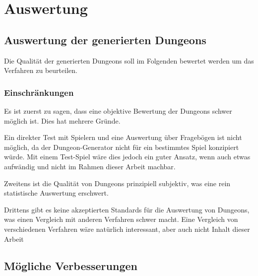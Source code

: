
\chapter{Auswertung}

\section{Auswertung der generierten Dungeons}

Die Qualität der generierten Dungeons soll im Folgenden bewertet werden um das Verfahren zu beurteilen. 

\subsection{Einschränkungen}

Es ist zuerst zu sagen, dass eine objektive Bewertung der Dungeons schwer möglich ist. Dies hat mehrere Gründe.

Ein direkter Test mit Spielern und eine Auswertung über Fragebögen ist nicht möglich, da der Dungeon-Generator nicht für ein bestimmtes Spiel konzipiert würde. Mit einem Test-Spiel wäre dies jedoch ein guter Ansatz, wenn auch etwas aufwändig und nicht im Rahmen dieser Arbeit machbar.

Zweitens ist die Qualität von Dungeons prinzipiell subjektiv, was eine rein statistische Auswertung erschwert.

Drittens gibt es keine akzeptierten Standards für die Auswertung von Dungeons, was einen Vergleich mit anderen Verfahren schwer macht. Eine Vergleich von verschiedenen Verfahren wäre natürlich interessant, aber auch nicht Inhalt dieser Arbeit 




\section{Mögliche Verbesserungen}\label{s.verbesserungen}

